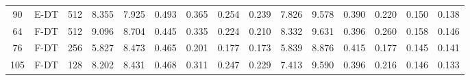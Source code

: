 \begin{table}
\begin{tabular}{@{\hskip3pt}c@{\hskip3pt}c@{\hskip3pt}c@{\hskip3pt}c@{\hskip3pt}c@{\hskip3pt}c@{\hskip3pt}c@{\hskip3pt}c@{\hskip3pt}c@{\hskip3pt}c@{\hskip3pt}c@{\hskip3pt}c@{\hskip3pt}c@{\hskip3pt}c@{\hskip3pt}c}
         90 &           E-DT &              512 &             8.355 &       7.925 &         0.493 &       0.365 &       0.254 &        0.239 &               7.826 &       9.578 &         0.390 &       0.220 &       0.150 &        0.138 \\
         64 &           F-DT &              512 &             9.096 &       8.704 &         0.445 &       0.335 &       0.224 &        0.210 &               8.332 &       9.631 &         0.396 &       0.260 &       0.158 &        0.146 \\
         76 &           F-DT &              256 &             5.827 &       8.473 &         0.465 &       0.201 &       0.177 &        0.173 &               5.839 &       8.876 &         0.415 &       0.177 &       0.145 &        0.141 \\
        105 &           F-DT &              128 &             8.202 &       8.431 &         0.468 &       0.311 &       0.247 &        0.229 &               7.413 &       9.590 &         0.396 &       0.216 &       0.146 &        0.133 \\
\bottomrule
\end{tabular}
\end{table}
